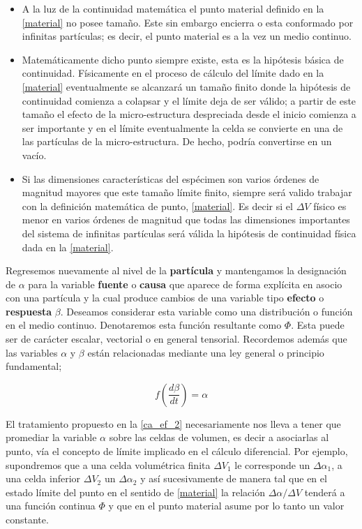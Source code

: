 \documentclass[../notas medios.tex]{subfiles}
\begin{document}
\begin{itemize}
\item A la luz de la continuidad matemática el punto material definido en la \cref{material} no posee tamaño.  Este sin embargo encierra o esta conformado por infinitas partículas; es decir, el punto material es a la vez un medio continuo.

\item Matemáticamente dicho punto siempre existe, esta es la hipótesis básica de
continuidad.  Físicamente en el proceso de cálculo del límite dado en la
\cref{material} eventualmente se alcanzará un tamaño finito donde la hipótesis de continuidad comienza a colapsar y el límite deja de ser válido; a partir de este tamaño el efecto de la micro-estructura despreciada desde el inicio comienza a ser importante y en el límite eventualmente la celda se convierte en una de las partículas de la micro-estructura.  De hecho, podría convertirse en un vacío.

\item Si las dimensiones características del espécimen son varios órdenes de
magnitud mayores que este tamaño límite finito, siempre será valido trabajar con
la definición matemática de punto, \cref{material}.  Es decir si el $\Delta V$
físico es menor en varios órdenes de magnitud que todas las dimensiones
importantes del sistema de infinitas partículas será válida la hipótesis de
continuidad física dada en la \cref{material}.
  
\end{itemize}

Regresemos nuevamente al nivel de la {\bf partícula} y mantengamos la
designación de $\alpha$ para la variable {\bf fuente} o {\bf causa} que aparece de forma explícita en asocio con una partícula y la cual produce cambios de una variable tipo {\bf efecto} o {\bf respuesta} $\beta$. Deseamos considerar esta variable como una distribución o función en el medio continuo.  Denotaremos esta función resultante como $\Phi$.  Esta puede ser de carácter escalar, vectorial o en general tensorial.  Recordemos además que las variables $\alpha$ y $\beta$ están relacionadas mediante una ley general o principio fundamental;

\begin{equation}
f\left( {\frac{{d\beta }}{{dt}}} \right) = \alpha
\label{ca_ef_2}
\end{equation}

El tratamiento propuesto en la \cref{ca_ef_2} necesariamente nos lleva a tener
que promediar la variable $\alpha$ sobre las celdas de volumen, es decir a
asociarlas al punto, vía el concepto de límite implicado en el cálculo
diferencial. Por ejemplo, supondremos que a una celda volumétrica finita $\Delta
{V_1}$ le corresponde un $\Delta {\alpha _1}$, a una celda inferior $\Delta
{V_2}$ un $\Delta {\alpha _2}$ y así sucesivamente de manera tal que en el estado límite del punto en el sentido de \cref{material} la relación $\Delta \alpha /\Delta V$ tenderá a una función continua $\Phi$ y que en el punto material asume por lo tanto un valor constante.
\end{document}
